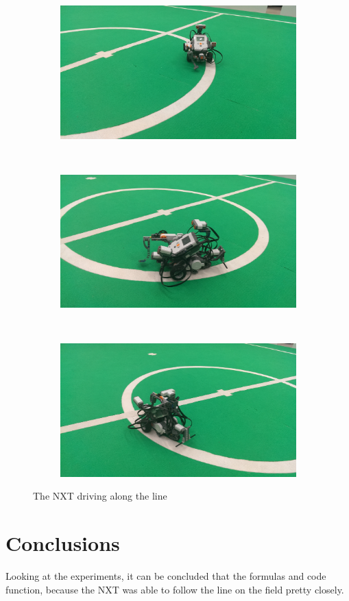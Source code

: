 \documentclass[12pt]{article}
\begin{document}
\begin{figure}[h!]
    \centering
    \begin{subfigure}[b]{0.3\textwidth}
            \includegraphics[width=\textwidth]{lijn1.jpg}
    \end{subfigure}%
    ~ 
    \begin{subfigure}[b]{0.3\textwidth}
            \includegraphics[width=\textwidth]{lijn2.jpg}
    \end{subfigure}
    ~ 
    \begin{subfigure}[b]{0.3\textwidth}
            \includegraphics[width=\textwidth]{lijn3.jpg}
    \end{subfigure}
    \caption{The NXT driving along the line}
    \label{driveline}
\end{figure}
\section{Conclusions}
Looking at the experiments, it can be concluded that the formulas and code function, because the NXT was able to follow the line on the field pretty closely.
\end{document}
